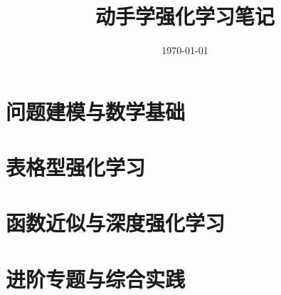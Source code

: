 \documentclass[UTF8,12pt,a4paper,fontset=fandol]{ctexbook}
\title{动手学强化学习笔记}
\author{}
\date{\today}
\begin{document}
\frontmatter %


\maketitle
\tableofcontents
\clearpage


\mainmatter

\part{问题建模与数学基础}






\part{表格型强化学习}







\part{函数近似与深度强化学习}







\part{进阶专题与综合实践}








\appendix
\end{document}
